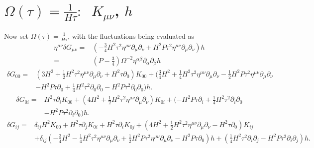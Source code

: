 \documentclass[10pt,letterpaper]{article}
\begin{document}
\section*{$\Omega(\tau)=\tfrac{1}{H\tau}:$\  $K_{\mu\nu}$, $h$}
Now set $\Omega(\tau) = \frac{1}{H\tau}$, with the fluctuations being evaluated as
\begin{align}
\eta^{\mu\nu}\delta G_{\mu\nu} =&{}
(- \tfrac{3}{4} H^2 \tau^2 \eta^{\mu \nu} \partial_{\mu} \partial_{\nu} + H^2 P \tau^2 \eta^{\mu \nu} \partial_{\mu} \partial_{\nu}) h\nonumber\\
=&{}(P-\tfrac34) \Omega^{-2}\eta^{\alpha\beta}\partial_\alpha\partial_\beta h
\end{align}
\begin{align}
\delta G_{00}={}&(3 H^2
 + \tfrac{1}{2} H^2 \tau^2 \eta^{\mu \nu} \partial_{\mu} \partial_{\nu}
 + H^2 \tau \partial_{0}) K_{00}
 + (\tfrac{3}{4} H^2
 + \tfrac{1}{4} H^2 \tau^2 \eta^{\mu \nu} \partial_{\mu} \partial_{\nu}
 -  \tfrac{1}{2} H^2 P \tau^2 \eta^{\mu \nu} \partial_{\mu} \partial_{\nu}\nonumber\\
& -  H^2 P \tau \partial_{0}
 + \tfrac{1}{4} H^2 \tau^2 \partial_{0} \partial_{0}
 -  H^2 P \tau^2 \partial_{0} \partial_{0}) h.
\end{align}
\begin{align}
\delta G_{0i}={}&H^2 \tau \partial_{i} K_{00}
 + (4 H^2
 + \tfrac{1}{2} H^2 \tau^2 \eta^{\mu \nu} \partial_{\mu} \partial_{\nu}) K_{0i}
 + (- H^2 P \tau \partial_{i}
 + \tfrac{1}{4} H^2 \tau^2 \partial_{i} \partial_{0}\nonumber\\
& -  H^2 P \tau^2 \partial_{i} \partial_{0}) h.
\end{align}
\begin{align}
\delta G_{ij}={}&\delta_{ij} H^2 K_{00}
 + H^2 \tau \partial_{j} K_{0i}
 + H^2 \tau \partial_{i} K_{0j}
 + (4 H^2
 + \tfrac{1}{2} H^2 \tau^2 \eta^{\mu \nu} \partial_{\mu} \partial_{\nu}
 -  H^2 \tau \partial_{0}) K_{ij}\nonumber\\
&
 + \delta_{ij}(- \tfrac{3}{4} H^2 -  \tfrac{1}{4} H^2 \tau^2 \eta^{\mu \nu} \partial_{\mu} \partial_{\nu}
 + \tfrac{1}{2} H^2 P \tau^2 \eta^{\mu \nu} \partial_{\mu} \partial_{\nu}
 -  H^2 P \tau \partial_{0})h
 + (\tfrac{1}{4} H^2 \tau^2 \partial_{i} \partial_{j}
 -  H^2 P \tau^2 \partial_{i} \partial_{j}) h.
\end{align}
\end{document}
